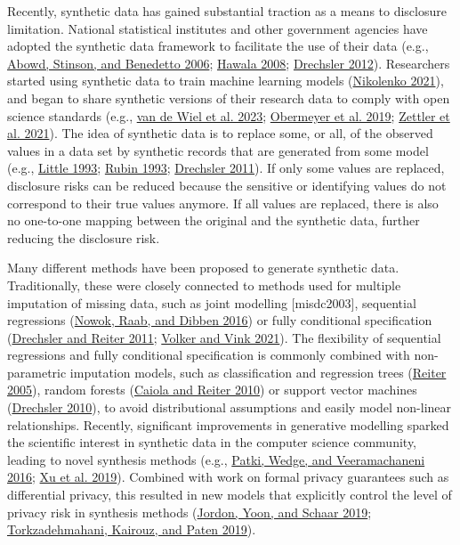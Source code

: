 \documentclass[
]{article}
\begin{document}
Recently, synthetic data has gained substantial traction as a means to
disclosure limitation. National statistical institutes and other
government agencies have adopted the synthetic data framework to
facilitate the use of their data (e.g.,
\protect\hyperlink{ref-SIPP_Beta_2006}{Abowd, Stinson, and Benedetto
2006}; \protect\hyperlink{ref-hawala_synthetic_2008}{Hawala 2008};
\protect\hyperlink{ref-drechsler2012}{Drechsler 2012}). Researchers
started using synthetic data to train machine learning models
(\protect\hyperlink{ref-nikolenko2021}{Nikolenko 2021}), and began to
share synthetic versions of their research data to comply with open
science standards (e.g., \protect\hyperlink{ref-vandewiel2023}{van de
Wiel et al. 2023}; \protect\hyperlink{ref-obermeyer2019}{Obermeyer et
al. 2019}; \protect\hyperlink{ref-zettler2021}{Zettler et al. 2021}).
The idea of synthetic data is to replace some, or all, of the observed
values in a data set by synthetic records that are generated from some
model (e.g., \protect\hyperlink{ref-little_statistical_1993}{Little
1993}; \protect\hyperlink{ref-rubin_statistical_1993}{Rubin 1993};
\protect\hyperlink{ref-drechsler2011synthetic}{Drechsler 2011}). If only
some values are replaced, disclosure risks can be reduced because the
sensitive or identifying values do not correspond to their true values
anymore. If all values are replaced, there is also no one-to-one mapping
between the original and the synthetic data, further reducing the
disclosure risk.

Many different methods have been proposed to generate synthetic data.
Traditionally, these were closely connected to methods used for multiple
imputation of missing data, such as joint modelling {[}misdc2003{]},
sequential regressions (\protect\hyperlink{ref-nowok2016}{Nowok, Raab,
and Dibben 2016}) or fully conditional specification
(\protect\hyperlink{ref-drechsler2011empirical}{Drechsler and Reiter
2011}; \protect\hyperlink{ref-volker2021}{Volker and Vink 2021}). The
flexibility of sequential regressions and fully conditional
specification is commonly combined with non-parametric imputation
models, such as classification and regression trees
(\protect\hyperlink{ref-reiter2005}{Reiter 2005}), random forests
(\protect\hyperlink{ref-caiola2010}{Caiola and Reiter 2010}) or support
vector machines (\protect\hyperlink{ref-drechsler2010}{Drechsler 2010}),
to avoid distributional assumptions and easily model non-linear
relationships. Recently, significant improvements in generative
modelling sparked the scientific interest in synthetic data in the
computer science community, leading to novel synthesis methods (e.g.,
\protect\hyperlink{ref-patki2016}{Patki, Wedge, and Veeramachaneni
2016}; \protect\hyperlink{ref-xu_ctgan_2019}{Xu et al. 2019}). Combined
with work on formal privacy guarantees such as differential privacy,
this resulted in new models that explicitly control the level of privacy
risk in synthesis methods
(\protect\hyperlink{ref-jordon2018pategan}{Jordon, Yoon, and Schaar
2019}; \protect\hyperlink{ref-Torkzadehmahani2019}{Torkzadehmahani,
Kairouz, and Paten 2019}).
\end{document}
